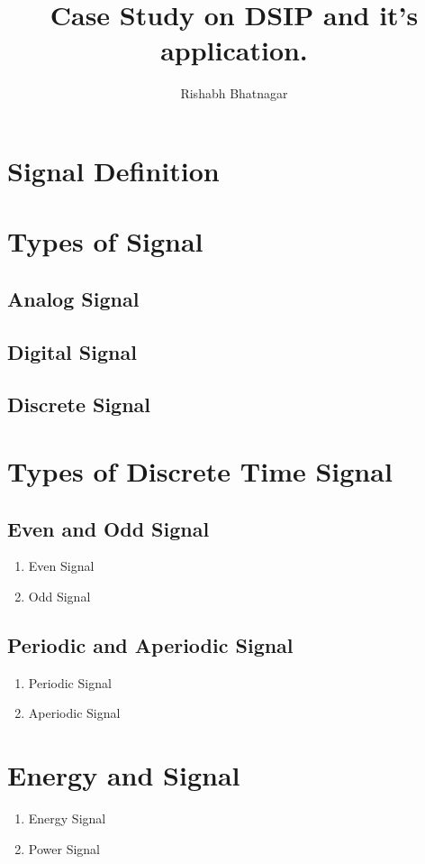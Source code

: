 \documentclass{article}
\begin{document}
   \title{Case Study on DSIP and it's application.}                           
    \author{Rishabh Bhatnagar}
    \maketitle
    \tableofcontents
    \newpage

    \begin{multicols}{2}
    \section{Signal Definition}
    \section{Types of Signal}
        \subsection{Analog Signal}
        \subsection{Digital Signal}
        \subsection{Discrete Signal}
    \section{Types of Discrete Time Signal}
        \subsection{Even and Odd Signal}
            \begin{enumerate}
                \item Even Signal
                \item Odd Signal
            \end{enumerate}
        \subsection{Periodic and Aperiodic Signal}
            \begin{enumerate}
                \item Periodic Signal
                \item Aperiodic Signal
            \end{enumerate}
    \section{Energy and Signal}
        \begin{enumerate}
            \item Energy Signal
            \item Power Signal
        \end{enumerate}

\end{multicols}
\end{document}
